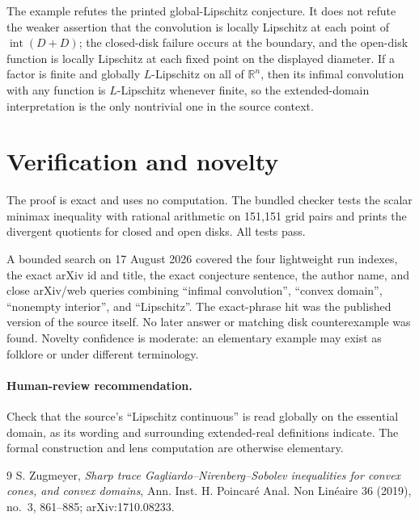 \documentclass[11pt]{article}
\newcommand{\R}{\mathbb R}
\begin{document}
The example refutes the printed global-Lipschitz conjecture.  It does not
refute the weaker assertion that the convolution is locally Lipschitz at each
point of $\operatorname{int}(D+D)$; the closed-disk failure occurs at the
boundary, and the open-disk function is locally Lipschitz at each fixed point
on the displayed diameter.  If a factor is finite and globally $L$-Lipschitz
on all of $\R^n$, then its infimal convolution with any function is
$L$-Lipschitz whenever finite, so the extended-domain interpretation is the
only nontrivial one in the source context.

\section*{Verification and novelty}

The proof is exact and uses no computation.  The bundled checker tests the
scalar minimax inequality with rational arithmetic on 151,151 grid pairs and
prints the divergent quotients for closed and open disks.  All tests pass.

A bounded search on 17 August 2026 covered the four lightweight run indexes,
the exact arXiv id and title, the exact conjecture sentence, the author name,
and close arXiv/web queries combining ``infimal convolution'', ``convex
domain'', ``nonempty interior'', and ``Lipschitz''.  The exact-phrase hit was
the published version of the source itself.  No later answer or matching disk
counterexample was found.  Novelty confidence is moderate: an elementary
example may exist as folklore or under different terminology.

\paragraph{Human-review recommendation.}
Check that the source's ``Lipschitz continuous'' is read globally on the
essential domain, as its wording and surrounding extended-real definitions
indicate.  The formal construction and lens computation are otherwise
elementary.

\begin{thebibliography}{9}
S. Zugmeyer,
\emph{Sharp trace Gagliardo--Nirenberg--Sobolev inequalities for convex
cones, and convex domains},
Ann. Inst. H. Poincar\'e Anal. Non Lin\'eaire 36 (2019), no.~3, 861--885;
arXiv:1710.08233.
\end{thebibliography}
\end{document}
